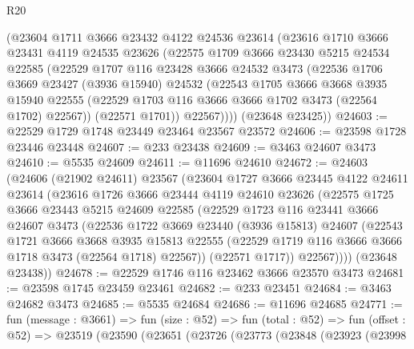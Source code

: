 \begin{lexlean}{R20}
\begin{coremodule}
      (@23604
        @1711
        @3666
        @23432
        @4122
        @24536
        @23614
        (@23616
          @1710
          @3666
          @23431
          @4119
          @24535
          @23626
          (@22575
            @1709
            @3666
            @23430
            @5215
            @24534
            @22585
            (@22529
              @1707
              @116
              @23428
              @3666
              @24532
              @3473
              (@22536
                @1706
                @3669
                @23427
                (@3936 @15940)
                @24532
                (@22543
                  @1705
                  @3666
                  @3668
                  @3935
                  @15940
                  @22555
                  (@22529 @1703 @116 @3666 @3666 @1702 @3473 (@22564 @1702) @22567))
                (@22571 @1701))
              @22567))))
      (@23648 @23425))
@24603 := @22529 @1729 @1748 @23449 @23464 @23567 @23572
@24606 := @23598 @1728 @23446 @23448
@24607 := @233 @23438
@24609 := @3463 @24607 @3473
@24610 := @5535 @24609
@24611 := @11696 @24610
@24672 := @24603
    (@24606
      (@21902 @24611)
      @23567
      (@23604
        @1727
        @3666
        @23445
        @4122
        @24611
        @23614
        (@23616
          @1726
          @3666
          @23444
          @4119
          @24610
          @23626
          (@22575
            @1725
            @3666
            @23443
            @5215
            @24609
            @22585
            (@22529
              @1723
              @116
              @23441
              @3666
              @24607
              @3473
              (@22536
                @1722
                @3669
                @23440
                (@3936 @15813)
                @24607
                (@22543
                  @1721
                  @3666
                  @3668
                  @3935
                  @15813
                  @22555
                  (@22529 @1719 @116 @3666 @3666 @1718 @3473 (@22564 @1718) @22567))
                (@22571 @1717))
              @22567))))
      (@23648 @23438))
@24678 := @22529 @1746 @116 @23462 @3666 @23570 @3473
@24681 := @23598 @1745 @23459 @23461
@24682 := @233 @23451
@24684 := @3463 @24682 @3473
@24685 := @5535 @24684
@24686 := @11696 @24685
@24771 := fun (message : @3661) =>
  fun (size : @52) =>
  fun (total : @52) =>
  fun (offset : @52) =>
  @23519
    (@23590
      (@23651
        (@23726
          (@23773
            (@23848
              (@23923
                (@23998

\end{coremodule}
\end{lexlean}
